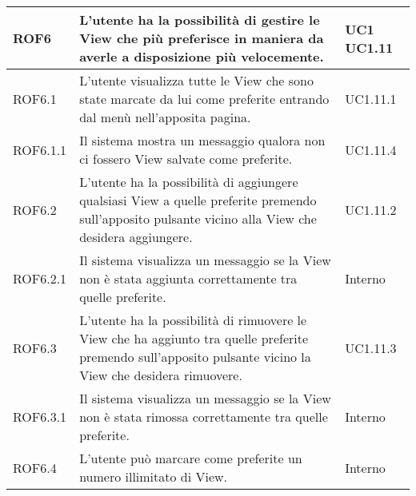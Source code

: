 \begin{center}
\begin{longtable}{| p{2.5cm} | p{8cm} | p{2cm} |}
		ROF6  & L'utente ha la possibilità di gestire le View che più preferisce in maniera da averle a disposizione più velocemente. &  UC1 \newline UC1.11 \\
		\hline
		ROF6.1  & L'utente visualizza tutte le View che sono state marcate da lui come preferite entrando dal menù nell'apposita pagina. & UC1.11.1 \\
		\hline
		ROF6.1.1  & Il sistema mostra un messaggio qualora non ci fossero View salvate come preferite. &  UC1.11.4 \\
		\hline
		ROF6.2  & L'utente ha la possibilità di aggiungere qualsiasi View a quelle preferite premendo sull'apposito pulsante vicino alla View che desidera aggiungere.  & UC1.11.2 \\
		\hline
		ROF6.2.1  & Il sistema visualizza un messaggio se la View non è stata aggiunta correttamente tra quelle preferite.  & Interno \\
		\hline
		ROF6.3  & L'utente ha la possibilità di rimuovere le View che ha aggiunto tra quelle preferite premendo sull'apposito pulsante vicino la View che desidera rimuovere.  &  UC1.11.3 \\
		\hline
		ROF6.3.1  & Il sistema visualizza un messaggio se la View non è stata rimossa correttamente tra quelle preferite.  &  Interno \\
		\hline
		ROF6.4 & L'utente può marcare come preferite un numero illimitato di View. &  Interno \\
		\hline



\end{longtable}
\end{center}
